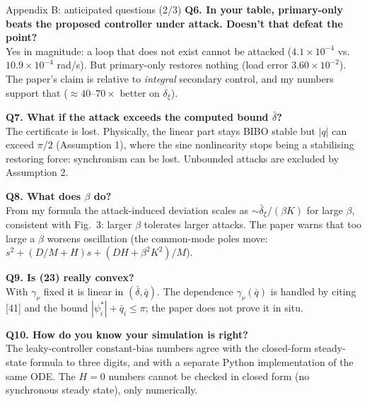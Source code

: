 \documentclass[aspectratio=169,9pt]{beamer}
\begin{document}
\begin{frame}[t]{Appendix B: anticipated questions (2/3)}
\scriptsize
\textbf{Q6. In your table, primary-only beats the proposed controller under attack. Doesn't that defeat the point?}\\
Yes in magnitude: a loop that does not exist cannot be attacked ($4.1\times10^{-4}$ vs.\ $10.9\times10^{-4}$ rad/s). But primary-only restores nothing (load error $3.60\times10^{-2}$). The paper's claim is relative to \emph{integral} secondary control, and my numbers support that ($\approx40$--$70\times$ better on $\delta_\xi$).
\medskip

\textbf{Q7. What if the attack exceeds the computed bound $\bar\delta$?}\\
The certificate is lost. Physically, the linear part stays BIBO stable but $|q|$ can exceed $\pi/2$ (Assumption 1), where the sine nonlinearity stops being a stabilising restoring force: synchronism can be lost. Unbounded attacks are excluded by Assumption 2.
\medskip

\textbf{Q8. What does $\beta$ do?}\\
From my formula the attack-induced deviation scales as $\sim\bar\delta_\xi/(\beta K)$ for large $\beta$, consistent with Fig.~3: larger $\beta$ tolerates larger attacks. The paper warns that too large a $\beta$ worsens oscillation (the common-mode poles move: $s^2+(D/M{+}H)s+(DH{+}\beta^2K^2)/M$).
\medskip

\textbf{Q9. Is (23) really convex?}\\
With $\gamma_\nu$ fixed it is linear in $(\bar\delta,\bar q)$. The dependence $\gamma_\nu(\bar q)$ is handled by citing [41] and the bound $|\psi_i^*|+\bar q_i\le\pi$; the paper does not prove it in situ.
\medskip

\textbf{Q10. How do you know your simulation is right?}\\
The leaky-controller constant-bias numbers agree with the closed-form steady-state formula to three digits, and with a separate Python implementation of the same ODE. The $H=0$ numbers cannot be checked in closed form (no synchronous steady state), only numerically.
\end{frame}
\end{document}
